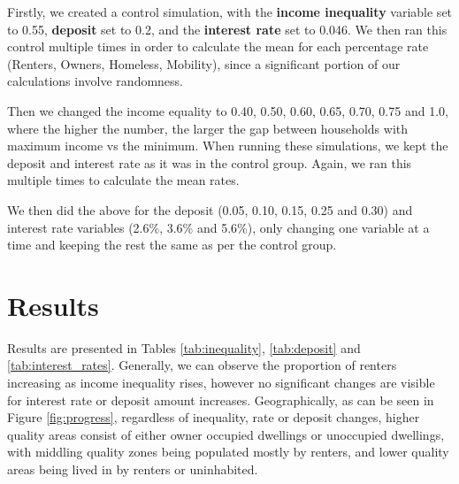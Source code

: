 \documentclass[11pt]{article}
\begin{document}
Firstly, we created a control simulation, with the \textbf{income inequality} variable set to 0.55, 
\textbf{deposit} set to 0.2, and the \textbf{interest rate} set to 0.046. We then ran this control 
multiple times in order to calculate the mean for each percentage rate (Renters, Owners, Homeless, Mobility),
since a significant portion of our calculations involve randomness. 

Then we changed the income equality to 0.40, 0.50, 0.60, 0.65, 0.70, 0.75 and 1.0, where the higher the number, the larger the gap between households with
maximum income vs the minimum. When running these simulations, we kept the deposit and interest rate as it
was in the control group. Again, we ran this multiple times to calculate the mean rates. 

We then did the above for the deposit (0.05, 0.10, 0.15, 0.25 and 0.30) and %
interest rate variables (2.6\%, 3.6\% and 5.6\%), only changing one variable at 
a time and keeping the rest the same as per the control group.

\section{Results}
Results are presented in Tables \ref{tab:inequality}, \ref{tab:deposit} and \ref{tab:interest_rates}.
Generally, we can observe the proportion of renters increasing as income inequality rises, however
no significant changes are visible for interest rate or deposit amount increases. Geographically,
as can be seen in Figure \ref{fig:progress},
regardless of inequality, rate or deposit changes, higher quality areas consist of either owner
occupied dwellings or unoccupied dwellings, with middling quality zones being populated mostly by renters,
and lower quality areas being lived in by renters or uninhabited.
\end{document}
